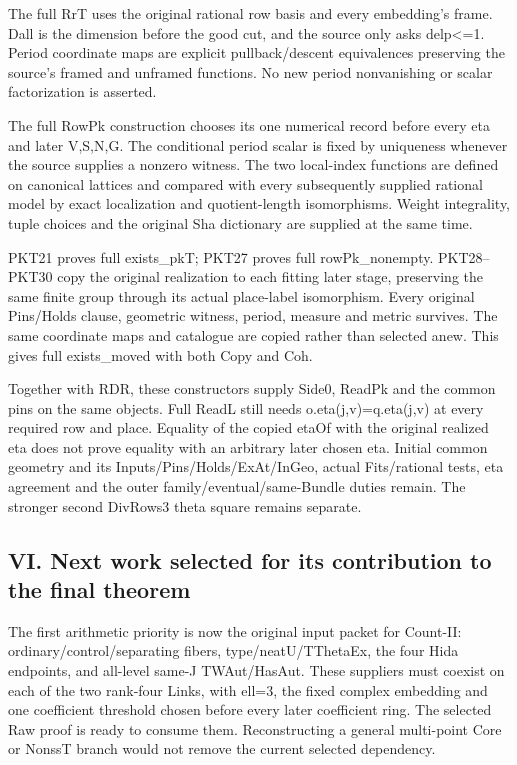 The full RrT uses the original rational row basis and every embedding's frame. Dall is the dimension before the good cut, and the source only asks delp<=1. Period coordinate maps are explicit pullback/\allowbreak{}descent equivalences preserving the source's framed and unframed functions. No new period nonvanishing or scalar factorization is asserted.

The full RowPk construction chooses its one numerical record before every eta and later V,S,N,G. The conditional period scalar is fixed by uniqueness whenever the source supplies a nonzero witness. The two local-index functions are defined on canonical lattices and compared with every subsequently supplied rational model by exact localization and quotient-length isomorphisms. Weight integrality, tuple choices and the original Sha dictionary are supplied at the same time.

PKT21 proves full exists\_\allowbreak{}pkT; PKT27 proves full rowPk\_\allowbreak{}nonempty. PKT28–PKT30 copy the original realization to each fitting later stage, preserving the same finite group through its actual place-label isomorphism. Every original Pins/\allowbreak{}Holds clause, geometric witness, period, measure and metric survives. The same coordinate maps and catalogue are copied rather than selected anew. This gives full exists\_\allowbreak{}moved with both Copy and Coh.

Together with RDR, these constructors supply Side0, ReadPk and the common pins on the same objects. Full ReadL still needs o.eta(j,v)=q.eta(j,v) at every required row and place. Equality of the copied etaOf with the original realized eta does not prove equality with an arbitrary later chosen eta. Initial common geometry and its Inputs/\allowbreak{}Pins/\allowbreak{}Holds/\allowbreak{}ExAt/\allowbreak{}InGeo, actual Fits/\allowbreak{}rational tests, eta agreement and the outer family/\allowbreak{}eventual/\allowbreak{}same-Bundle duties remain. The stronger second DivRows3 theta square remains separate.

\subsection{VI. Next work selected for its contribution to the final theorem}

The first arithmetic priority is now the original input packet for Count-II: ordinary/\allowbreak{}control/\allowbreak{}separating fibers, type/\allowbreak{}neatU/\allowbreak{}TThetaEx, the four Hida endpoints, and all-level same-J TWAut/\allowbreak{}HasAut. These suppliers must coexist on each of the two rank-four Links, with ell=3, the fixed complex embedding and one coefficient threshold chosen before every later coefficient ring. The selected Raw proof is ready to consume them. Reconstructing a general multi-point Core or NonssT branch would not remove the current selected dependency.


